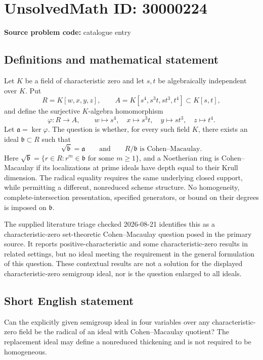 \documentclass[11pt]{article}
\begin{document}
\section*{UnsolvedMath ID: 30000224}
\textbf{Source problem code:} catalogue entry
\subsection{Definitions and mathematical statement}
Let \(K\) be a field of characteristic zero and let \(s,t\) be algebraically independent over \(K\). Put
\[
R=K[w,x,y,z],\qquad A=K[s^4,s^3t,st^3,t^4]\subset K[s,t],
\]
and define the surjective \(K\)-algebra homomorphism
\[
\varphi:R\longrightarrow A,\qquad
w\longmapsto s^4,\quad x\longmapsto s^3t,\quad y\longmapsto st^3,\quad z\longmapsto t^4.
\]
Let \(\mathfrak a=\ker\varphi\). The question is whether, for every such field \(K\), there exists an ideal \(\mathfrak b\subset R\) such that
\[
\sqrt{\mathfrak b}=\mathfrak a
\qquad\text{and}\qquad R/\mathfrak b\text{ is Cohen--Macaulay}.
\]
Here \(\sqrt{\mathfrak b}=\{r\in R:r^m\in\mathfrak b\text{ for some }m\geq1\}\), and a Noetherian ring is Cohen--Macaulay if its localizations at prime ideals have depth equal to their Krull dimension. The radical equality requires the same underlying closed support, while permitting a different, nonreduced scheme structure. No homogeneity, complete-intersection presentation, specified generators, or bound on their degrees is imposed on \(\mathfrak b\).

The supplied literature triage checked 2026-08-21 identifies this as a characteristic-zero set-theoretic Cohen--Macaulay question posed in the primary source. It reports positive-characteristic and some characteristic-zero results in related settings, but no ideal meeting the requirement in the general formulation of this question. These contextual results are not a solution for the displayed characteristic-zero semigroup ideal, nor is the question enlarged to all ideals.
\subsection{Short English statement}
Can the explicitly given semigroup ideal in four variables over any characteristic-zero field be the radical of an ideal with Cohen--Macaulay quotient? The replacement ideal may define a nonreduced thickening and is not required to be homogeneous.
\end{document}
